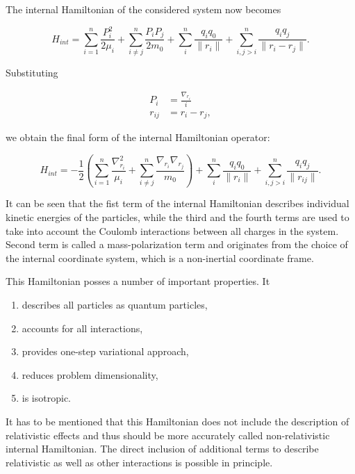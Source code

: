 The internal Hamiltonian of the considered system now becomes

\begin{equation}
H_{int} = \sum_{i=1}^n \frac{P^{2}_i}{2\mu_i} + \sum_{ i \neq j }^n \frac{P_i P_j}{2 m_0}
+ \sum_{i}^{n} \frac{q_i q_0}{\| r_i \|} + \sum_{i,j>i}^{n} \frac{q_i q_j}{\| r_i - r_j \|}.
\end{equation}

Substituting 

\begin{align}
P_i &= \frac{\nabla_{r_i}}{i} \\
r_{ij} &= r_i - r_j,
\end{align}

we obtain the final form of the internal Hamiltonian operator:

\begin{equation}
H_{int} = -\frac{1}{2} \left( \sum_{i=1}^n \frac{\nabla^2_{r_i}}{\mu_i} + \sum_{ i \neq j }^n \frac{\nabla_{r_i} \nabla_{r_j}}{m_0} \right)
+ \sum_{i}^{n} \frac{q_i q_0}{\| r_i \|} + \sum_{i,j>i}^{n} \frac{q_i q_j}{\| r_{ij} \|}.
\label{intH}
\end{equation}

It can be seen that the fist term of the internal Hamiltonian describes 
individual kinetic energies of the particles, while the third and the fourth
terms are used to take into account the Coulomb interactions between all
charges in the system. Second term is called a mass-polarization term and
originates from the choice of the internal coordinate system, which is
a non-inertial coordinate frame.

This Hamiltonian posses a number of important properties. It 
\begin{enumerate}
  \item describes all particles as quantum particles,
  \item accounts for all interactions,
  \item provides one-step variational approach,
  \item reduces problem dimensionality,
  \item is isotropic.
\end{enumerate}

It has to be mentioned that this Hamiltonian does not include the description 
of relativistic effects and thus should be more accurately called non-relativistic
internal Hamiltonian. The direct inclusion of additional terms to describe
relativistic as well as other interactions is possible in principle.


